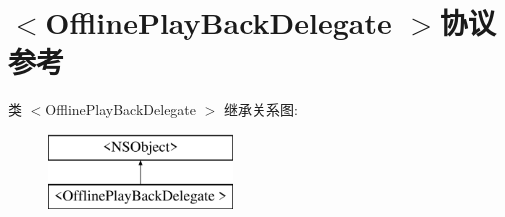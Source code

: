 \hypertarget{protocol_offline_play_back_delegate_01-p}{}\section{$<$Offline\+Play\+Back\+Delegate $>$协议 参考}
\label{protocol_offline_play_back_delegate_01-p}
类 $<$Offline\+Play\+Back\+Delegate $>$ 继承关系图\+:\begin{figure}[H]
\begin{center}
\leavevmode
\includegraphics[height=2.000000cm]{protocol_offline_play_back_delegate_01-p}
\end{center}
\end{figure}
